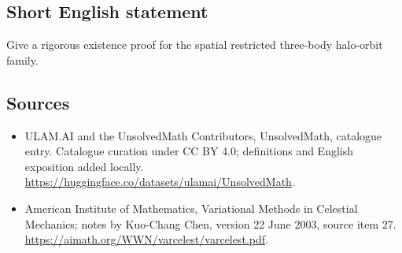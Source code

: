 \documentclass[11pt]{article}
\begin{document}
\subsection{Short English statement}
Give a rigorous existence proof for the spatial restricted three-body halo-orbit family.
\subsection{Sources}
\begin{itemize}
\item[\hypertarget{source:statement:1}{S1}] ULAM.AI and the UnsolvedMath Contributors, UnsolvedMath, catalogue entry. Catalogue curation under CC BY 4.0; definitions and English exposition added locally.
\url{https://huggingface.co/datasets/ulamai/UnsolvedMath}.
\item[\hypertarget{source:statement:2}{S2}] American Institute of Mathematics, Variational Methods in Celestial Mechanics; notes by Kuo-Chang Chen, version 22 June 2003, source item 27.
\url{https://aimath.org/WWN/varcelest/varcelest.pdf}.
\end{itemize}
\label{end:statement}
\end{document}
